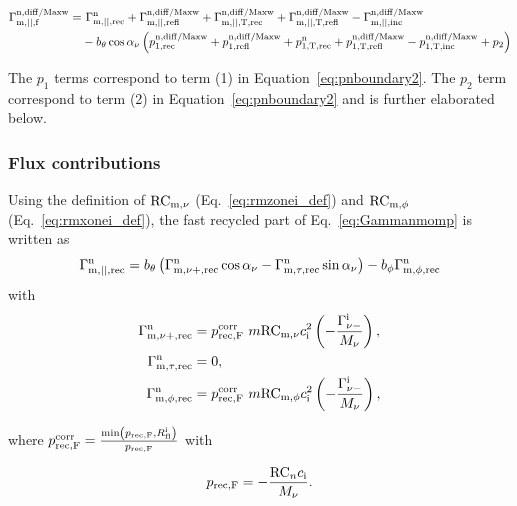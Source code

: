 \begin{align}
\Gamma^{\mathrm{n,diff/Maxw}}_{\mathrm{m,||,f}} = & \ \Gamma^{\mathrm{n}}_{\mathrm{m,||,rec}} + \Gamma^{\mathrm{n,diff/Maxw}}_{\mathrm{m,||,refl}} +
\Gamma^{\mathrm{n,diff/Maxw}}_{\mathrm{m,||,T,rec}} +
\Gamma^{\mathrm{n,diff/Maxw}}_{\mathrm{m,||,T,refl}} -
\Gamma^{\mathrm{n,diff/Maxw}}_{\mathrm{m,||,inc}} \nonumber \\
& -
\pit \cosa \left( p^{\mathrm{n,diff/Maxw}}_{\mathrm{1,rec}} + p^{\mathrm{n,diff/Maxw}}_{\mathrm{1,refl}} + p^{\mathrm{n}}_{\mathrm{1,T,rec}} +
p^{\mathrm{n,diff/Maxw}}_{\mathrm{1,T,refl}} -
p^{\mathrm{n,diff/Maxw}}_{\mathrm{1,T,inc}} + p_2 \right) \label{eq:par_mom_final}
\end{align}

The $p_1$ terms correspond to term (1) in Equation~\eqref{eq:pnboundary2}. The $p_2$ term correspond to term (2) in Equation~\eqref{eq:pnboundary2} and is further elaborated below.

\subsubsection{Flux contributions}

Using the definition of $\mathrm{RC}_{\mathrm{m},\nu}$ (Eq.~\eqref{eq:rmzonei_def}) and $\mathrm{RC}_{\mathrm{m},\phi}$ (Eq.~\eqref{eq:rmxonei_def}), the fast recycled part of Eq.~\eqref{eq:Gammanmomp} is written as
\begin{equation}
\Gamma^{\mathrm{n}}_{\mathrm{m,||,rec}} = b_{\theta} \left( \Gamma^{\mathrm{n}}_{\mathrm{m,\nu+,rec}} \cos \alpha_{\nu} - \Gamma^{\mathrm{n}}_{\mathrm{m,\tau,rec}} \sin \alpha_{\nu} \right) - b_{\phi} \Gamma^{\mathrm{n}}_{\mathrm{m,\phi,rec}}
\end{equation}
with
\begin{align}
    \Gamma^{\mathrm{n}}_{\mathrm{m,\nu+,rec}} & = p_{\mathrm{rec,F}}^{\mathrm{corr}} \ m \mathrm{RC}_{\mathrm{m},\nu} c_{\mathrm{i}}^2 \left( - \frac{\Gamma^{\mathrm{i}}_{\nu-}}{M_\nu} \right), \\
    \Gamma^{\mathrm{n}}_{\mathrm{m,\tau,rec}} & = 0, \\
    \Gamma^{\mathrm{n}}_{\mathrm{m,\phi,rec}} & = p_{\mathrm{rec,F}}^{\mathrm{corr}} \ m \mathrm{RC}_{\mathrm{m},\phi} c_{\mathrm{i}}^2 \left( - \frac{\Gamma^{\mathrm{i}}_{\nu-}}{M_\nu} \right),
\end{align}

where $ p_{\mathrm{rec,F}}^{\mathrm{corr}} = \frac{\min \left( p_{\mathrm{rec,F}}, R^{\mathrm{i}}_\mathrm{fl} \right)}{p_{\mathrm{rec,F}}}$ with

\begin{equation}
    p_{\mathrm{rec,F}} = - \frac{\mathrm{RC}_n c_{\mathrm{i}}}{M_\nu}.
\end{equation}

